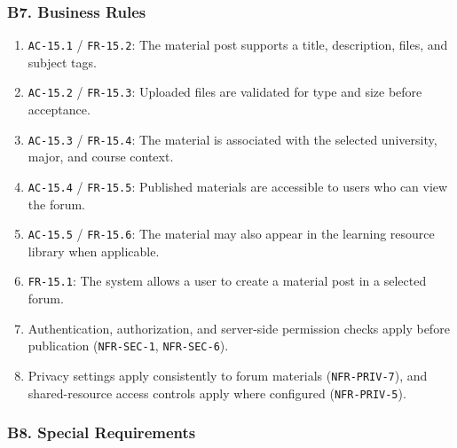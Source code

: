 \documentclass[12pt]{article}
\begin{document}
\subsubsection*{B7. Business Rules}
\par\medskip

\begin{enumerate}
\item \texttt{AC-15.1} / \texttt{FR-15.2}: The material post supports a title, description, files, and subject tags.
\item \texttt{AC-15.2} / \texttt{FR-15.3}: Uploaded files are validated for type and size before acceptance.
\item \texttt{AC-15.3} / \texttt{FR-15.4}: The material is associated with the selected university, major, and course context.
\item \texttt{AC-15.4} / \texttt{FR-15.5}: Published materials are accessible to users who can view the forum.
\item \texttt{AC-15.5} / \texttt{FR-15.6}: The material may also appear in the learning resource library when applicable.
\item \texttt{FR-15.1}: The system allows a user to create a material post in a selected forum.
\item Authentication, authorization, and server-side permission checks apply before publication (\texttt{NFR-SEC-1}, \texttt{NFR-SEC-6}).
\item Privacy settings apply consistently to forum materials (\texttt{NFR-PRIV-7}), and shared-resource access controls apply where configured (\texttt{NFR-PRIV-5}).
\end{enumerate}
\par\medskip

\hypertarget{sec:b8-special-requirements}{}
\subsubsection*{B8. Special Requirements}
\par\medskip
\end{document}
